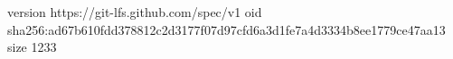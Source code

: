 version https://git-lfs.github.com/spec/v1
oid sha256:ad67b610fdd378812c2d3177f07d97cfd6a3d1fe7a4d3334b8ee1779ce47aa13
size 1233
